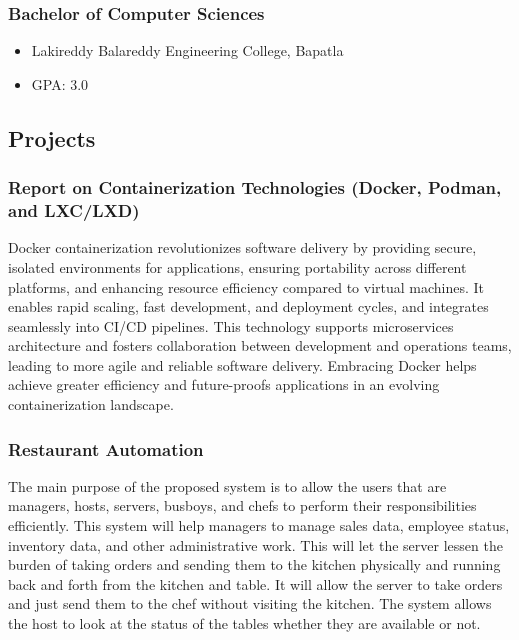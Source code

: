 \documentclass[
  16,
]{article}
\providecommand{\tightlist}{%
  \setlength{\itemsep}{0pt}\setlength{\parskip}{0pt}}\usepackage{longtable,booktabs,array}
\begin{document}
\subsubsection{Bachelor of Computer
Sciences}\label{bachelor-of-computer-sciences}

\begin{itemize}
\tightlist
\item
  Lakireddy Balareddy Engineering College, Bapatla
\item
  GPA: 3.0
\end{itemize}

\subsection{Projects}\label{projects}

\subsubsection{Report on Containerization Technologies (Docker, Podman,
and
LXC/LXD)}\label{report-on-containerization-technologies-docker-podman-and-lxclxd}

Docker containerization revolutionizes software delivery by providing
secure, isolated environments for applications, ensuring portability
across different platforms, and enhancing resource efficiency compared
to virtual machines. It enables rapid scaling, fast development, and
deployment cycles, and integrates seamlessly into CI/CD pipelines. This
technology supports microservices architecture and fosters collaboration
between development and operations teams, leading to more agile and
reliable software delivery. Embracing Docker helps achieve greater
efficiency and future-proofs applications in an evolving
containerization landscape.

\subsubsection{Restaurant Automation}\label{restaurant-automation}

The main purpose of the proposed system is to allow the users that are
managers, hosts, servers, busboys, and chefs to perform their
responsibilities efficiently. This system will help managers to manage
sales data, employee status, inventory data, and other administrative
work. This will let the server lessen the burden of taking orders and
sending them to the kitchen physically and running back and forth from
the kitchen and table. It will allow the server to take orders and just
send them to the chef without visiting the kitchen. The system allows
the host to look at the status of the tables whether they are available
or not.
\end{document}
